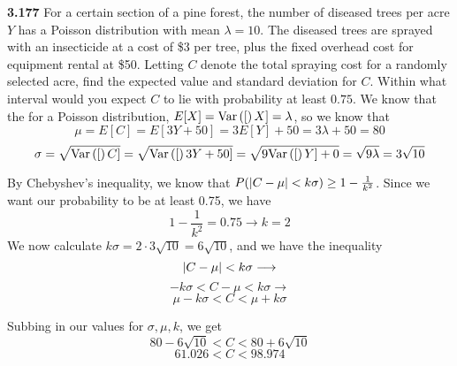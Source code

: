 \documentclass{exam}
\begin{document}
\begin{questions}
\newpage
\textbf{3.177 } For a certain section of a pine forest, the number of diseased trees per acre $Y$ has a Poisson distribution with mean $\lambda = 10$. The diseased trees are sprayed with an insecticide at a cost of \$3 per tree, plus the fixed overhead cost for equipment rental at \$50. Letting $C$ denote the total spraying cost for a randomly selected acre, find the expected value and standard deviation for $C$. Within what interval would you expect $C$ to lie with probability at least $0.75$.
\sol
We know that the for a Poisson distribution, $E[X] = \text{Var}\left( [ \right)X] = \lambda$, so we know that 
$$\mu = E[C] = E[3Y + 50] = 3E[Y] + 50 = 3\lambda + 50 = 80$$
$$\sigma = \sqrt{\text{Var}\left( [ \right)C]} = \sqrt{\text{Var}\left( [ \right)3Y + 50]} = \sqrt{9\text{Var}\left( [ \right)Y] + 0} = \sqrt{9\lambda} = 3\sqrt{10}$$

By Chebyshev's inequality, we know that $P(\left| C - \mu \right| < k\sigma) \geq 1 - \frac{1}{k^2}$. Since we want our probability to be at least 0.75, we have
$$1 - \frac{1}{k^2} = 0.75 \longrightarrow k = 2$$
We now calculate $k\sigma = 2 \cdot 3\sqrt{10} = 6\sqrt{10}$, and we have the inequality
$$\left| C - \mu \right| < k\sigma \longrightarrow$$
$$-k\sigma < C - \mu < k\sigma \rightarrow$$
$$\mu - k\sigma < C < \mu + k\sigma$$

Subbing in our values for $\sigma, \mu, k$, we get
$$80 - 6\sqrt{10} < C < 80 + 6\sqrt{10}$$
$$61.026 < C < 98.974$$
\end{questions}
\end{document}

